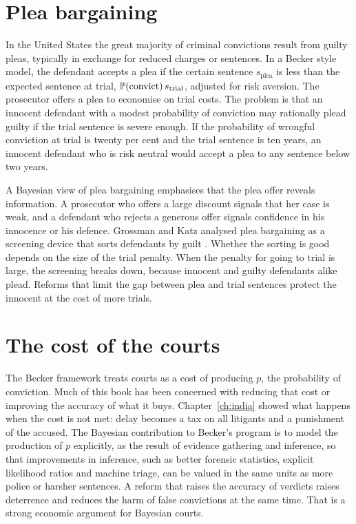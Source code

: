\section{Plea bargaining}

In the United States the great majority of criminal convictions result from guilty pleas, typically in exchange for reduced charges or sentences. In a Becker style model, the defendant accepts a plea if the certain sentence $s_{\text{plea}}$ is less than the expected sentence at trial, $\mathbb{P}(\text{convict})\,s_{\text{trial}}$, adjusted for risk aversion. The prosecutor offers a plea to economise on trial costs. The problem is that an innocent defendant with a modest probability of conviction may rationally plead guilty if the trial sentence is severe enough. If the probability of wrongful conviction at trial is twenty per cent and the trial sentence is ten years, an innocent defendant who is risk neutral would accept a plea to any sentence below two years.

A Bayesian view of plea bargaining emphasises that the plea offer reveals information. A prosecutor who offers a large discount signals that her case is weak, and a defendant who rejects a generous offer signals confidence in his innocence or his defence. Grossman and Katz analysed plea bargaining as a screening device that sorts defendants by guilt \citep{grossman1983}. Whether the sorting is good depends on the size of the trial penalty. When the penalty for going to trial is large, the screening breaks down, because innocent and guilty defendants alike plead. Reforms that limit the gap between plea and trial sentences protect the innocent at the cost of more trials.

\section{The cost of the courts}

The Becker framework treats courts as a cost of producing $p$, the probability of conviction. Much of this book has been concerned with reducing that cost or improving the accuracy of what it buys. Chapter~\ref{ch:india} showed what happens when the cost is not met: delay becomes a tax on all litigants and a punishment of the accused. The Bayesian contribution to Becker's program is to model the production of $p$ explicitly, as the result of evidence gathering and inference, so that improvements in inference, such as better forensic statistics, explicit likelihood ratios and machine triage, can be valued in the same units as more police or harsher sentences. A reform that raises the accuracy of verdicts raises deterrence and reduces the harm of false convictions at the same time. That is a strong economic argument for Bayesian courts.

